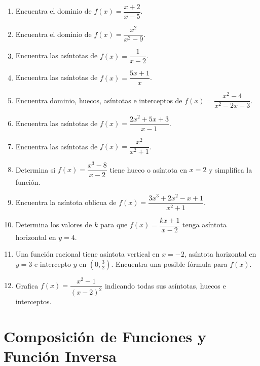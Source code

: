 \documentclass[12pt, a4paper]{article}
\begin{document}
\begin{enumerate}[leftmargin=*, resume]
  \item \facil{} Encuentra el dominio de $f(x) = \dfrac{x + 2}{x - 5}$.

  \item \facil{} Encuentra el dominio de $f(x) = \dfrac{x^2}{x^2 - 9}$.

  \item \facil{} Encuentra las asíntotas de $f(x) = \dfrac{1}{x - 2}$.

  \item \facil{} Encuentra las asíntotas de $f(x) = \dfrac{5x + 1}{x}$.

  \item \medio{} Encuentra dominio, huecos, asíntotas e interceptos de $f(x) = \dfrac{x^2 - 4}{x^2 - 2x - 3}$.

  \item \medio{} Encuentra las asíntotas de $f(x) = \dfrac{2x^2 + 5x + 3}{x - 1}$.

  \item \medio{} Encuentra las asíntotas de $f(x) = \dfrac{x^2}{x^2 + 1}$.

  \item \medio{} Determina si $f(x) = \dfrac{x^3 - 8}{x - 2}$ tiene hueco o asíntota en $x = 2$ y simplifica la función.

  \item \dificil{} Encuentra la asíntota oblicua de $f(x) = \dfrac{3x^3 + 2x^2 - x + 1}{x^2 + 1}$.

  \item \dificil{} Determina los valores de $k$ para que $f(x) = \dfrac{kx + 1}{x - 2}$ tenga asíntota horizontal en $y = 4$.

  \item \dificil{} Una función racional tiene asíntota vertical en $x = -2$, asíntota horizontal en $y = 3$ e intercepto $y$ en $(0, \frac{3}{2})$. Encuentra una posible fórmula para $f(x)$.

  \item \dificil{} Grafica $f(x) = \dfrac{x^2 - 1}{(x - 2)^2}$ indicando todas sus asíntotas, huecos e interceptos.
\end{enumerate}


\section{Composición de Funciones y Función Inversa}
\end{document}
